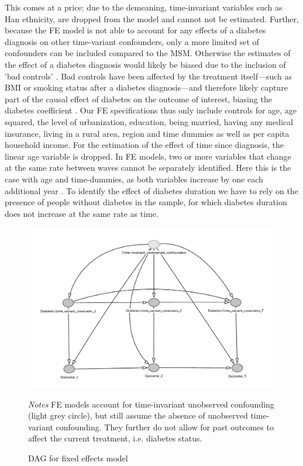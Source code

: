 This comes at a price: due to the demeaning, time-invariant variables such as Han ethnicity, are dropped from the model and cannot not be estimated. Further, because the \ac{FE} model is not able to account for any effects of a diabetes diagnosis on other time-variant confounders, only a more limited set of confounders can be included compared to the \ac{MSM}. Otherwise the estimates of the effect of a diabetes diagnosis would likely be biased due to the inclusion of 'bad controls' \parencite{Angrist2009a}. Bad controls have been affected by the treatment itself---such as \ac{BMI} or smoking status after a diabetes diagnosis---and therefore likely capture part of the causal effect of diabetes on the outcome of interest, biasing the diabetes coefficient \parencite{Angrist2009a}. Our \ac{FE} specifications thus only include controls for age, age squared, the level of urbanization, education, being married, having any medical insurance, living in a rural area, region and time dummies as well as per capita household income. For the estimation of the effect of time since diagnosis, the linear age variable is dropped. In \ac{FE} models, two or more variables that change at the same rate between waves cannot be separately identified. Here this is the case with age and time-dummies, as both variables increase by one each additional year \parencite{Wooldridge2012}. To identify the effect of diabetes duration we have to rely on the presence of people without diabetes in the sample, for which diabetes duration does not increase at the same rate as time.
\begin{figure}
\begin{center}
\caption{\label{fig:DAG_fe} \ac{DAG} for fixed effects model}
\includegraphics[scale=0.7]{Chapter5/DAG/dag_fe_alt}
\end{center}
\footnotesize{\textit{Notes} \ac{FE} models account for time-invariant unobserved confounding (light grey circle), but still assume the absence of unobserved time-variant confounding. They further do not allow for past outcomes to affect the current treatment, i.e. diabetes status. }
\end{figure}

